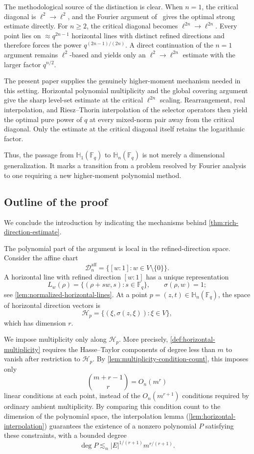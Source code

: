 \documentclass[11pt,letterpaper]{amsart}
\numberwithin{equation}{section}
\theoremstyle{definition}
\theoremstyle{remark}
\newcommand{\Fq}{\mathbb F_q}
\newcommand{\HH}{\mathbb H}
\begin{document}
The methodological source of the distinction is clear. When $n=1$, the critical diagonal is $\ell^2\to\ell^2$, and the Fourier argument of~\cite{PPTX26} gives the optimal strong estimate directly.  For $n\geq2$, the critical diagonal becomes $\ell^{2n}\to\ell^{2n}$.  Every point lies on $\approx q^{2n-1}$ horizontal lines with distinct refined directions and therefore forces the power $q^{(2n-1)/(2n)}$.  A direct continuation of the $n=1$ argument remains $\ell^2$-based and yields only an $\ell^2\to\ell^{2n}$ estimate with the larger factor $q^{n/2}$.

The present paper supplies the genuinely higher-moment mechanism needed in this setting. Horizontal polynomial multiplicity and the global covering argument give the sharp level-set estimate at the critical $\ell^{2n}$ scaling. Rearrangement, real interpolation, and Riesz--Thorin interpolation of the selector operators then yield the optimal pure power of $q$ at every mixed-norm pair away from the critical diagonal. Only the estimate at the critical diagonal itself retains the logarithmic factor.

Thus, the passage from $\HH_1(\Fq)$ to $\HH_n(\Fq)$ is not merely a
dimensional generalization. It marks a transition from a problem resolved by Fourier analysis to one requiring a new higher-moment polynomial method.


\subsection{Outline of the proof}

We conclude the introduction by indicating the mechanisms behind
\cref{thm:rich-direction-estimate}.

The polynomial part of the argument is local in the refined-direction
space. Consider the affine chart
\[
 \mathcal D_n^{\mathrm{aff}}
 =
 \{[w:1]:w\in V\setminus\{0\}\}.
\]
A horizontal line with refined direction $[w:1]$ has a unique
representation
\[
 L_w(\rho)
 =
 \{(\rho+sw,s):s\in\Fq\},
 \qquad
 \sigma(\rho,w)=1;
\]
see \cref{lem:normalized-horizontal-lines}. At a point
$p=(z,t)\in\HH_n(\Fq)$, the space of horizontal direction vectors is
\[
 \mathcal H_p
 =
 \{(\xi,\sigma(z,\xi)):\xi\in V\},
\]
which has dimension $r$.

We impose multiplicity only along $\mathcal H_p$. More precisely,
\cref{def:horizontal-multiplicity} requires the Hasse--Taylor
components of degree less than $m$ to vanish after restriction to
$\mathcal H_p$.  By \cref{lem:multiplicity-condition-count}, this
imposes only
\[
 \binom{m+r-1}{r}
 =
 O_n(m^r)
\]
linear conditions at each point, instead of the $O_n(m^{r+1})$ conditions required by ordinary ambient multiplicity.
By comparing this condition count to the dimension of the polynomial space, the interpolation lemma (\cref{lem:horizontal-interpolation}) guarantees the existence of a nonzero polynomial $P$ satisfying these constraints, with a bounded degree
\[
 \deg P
 \lesssim_n
 |E|^{1/(r+1)}m^{r/(r+1)}.
\]
\end{document}
